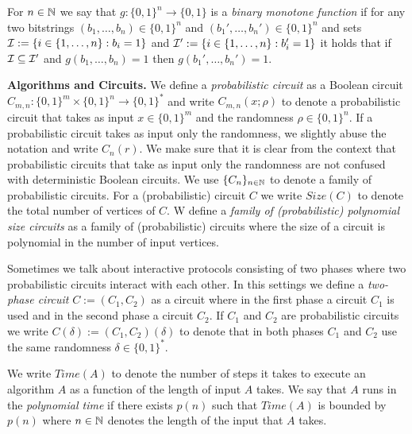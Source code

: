 \begin{definition}
For $n \in \mathbb{N}$ we say that $g: \{0,1\}^n \rightarrow \{0,1\}$ is a \textit{binary monotone function}
if for any two bitstrings $(b_1, \dotsc, b_n) \in \{0,1\}^{n}$ and $(b_1', \dotsc, b_n') \in \{0,1\}^{n}$
and sets $\mathcal{I} := \{i \in \{1,\dotsc, n\}: b_i = 1\}$ and $\mathcal{I}' := \{i \in \{1,\dotsc, n\} : b_i' = 1\}$ it holds
that if $\mathcal{I} \subseteq \mathcal{I}'$ and $g(b_1, \dotsc, b_n) = 1$ then $g(b_1', \dotsc, b_n') = 1$.
\end{definition}

\textbf{Algorithms and Circuits.}
We define a \textit{probabilistic circuit} as a Boolean circuit $C_{m,n} : \{0,1\}^{m} \times \{0,1\}^{n} \rightarrow \{0,1\}^{*}$ and
write $C_{m,n}(x;\rho)$ to denote a probabilistic circuit that takes as input $x \in \{0,1\}^{m}$ and the randomness $\rho \in \{0,1\}^{n}$.
If a probabilistic circuit takes as input only the randomness, we slightly abuse the notation and write $C_{n}(r)$.
We make sure that it is clear from the context that probabilistic circuits that take as input only the randomness
are not confused with deterministic Boolean circuits. We use $\{C_n\}_{n \in \mathbb{N}}$ to denote a family of probabilistic circuits.
For a (probabilistic) circuit $C$ we write $\mathit{Size}(C)$ to denote the total number of vertices of $C$.
W define a \textit{family of (probabilistic) polynomial size circuits} as a family of (probabilistic) circuits where
the size of a circuit is polynomial in the number of input vertices.

Sometimes we talk about interactive protocols consisting of two phases where two probabilistic circuits interact with each other.
In this settings we define a \textit{two-phase circuit} $C := (C_1, C_2)$ as a circuit
where in the first phase a circuit $C_1$ is used and in the second phase a circuit $C_2$.
If $C_1$ and $C_2$ are probabilistic circuits we write $C(\delta) := (C_1, C_2)(\delta)$
to denote that in both phases $C_1$ and $C_2$ use the same randomness $\delta \in \{0,1\}^{*}$.


We write $\mathit{Time}(A)$ to denote the number of steps it takes to execute
an algorithm $A$ as a function of the length of input $A$ takes.
We say that $A$ runs in the \textit{polynomial time} if there exists $p(n)$
such that $\mathit{Time}(A)$ is bounded by $p(n)$ where $n \in \mathbb{N}$ denotes the length of the input that $A$ takes.

